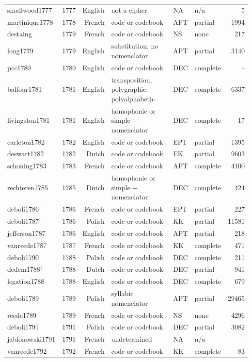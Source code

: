 {\begin{longtable}{@{}llrlllr@{}}
smallwood1777 & 1777 & English & not a cipher & NA & n/a & 5 \\
martinique1778 & 1778 & French & code or codebook & APT & partial & 1994 \\
destaing & 1779 & French & code or codebook & NS & none & 217 \\
long1779 & 1779 & English & substitution, no nomenclator & APT & partial & 3140 \\
pcc1780 & 1780 & English & code or codebook & DEC & complete & -- \\
balfour1781 & 1781 & English & transposition, polygraphic, polyalphabetic & DEC & complete & 6337 \\
livingston1781 & 1781 & English & homophonic or simple + nomenclator & DEC & complete & 17 \\
carleton1782 & 1782 & English & code or codebook & EPT & partial & 1395 \\
deswart1782 & 1782 & Dutch & code or codebook & EK & partial & 9603 \\
schoning1783 & 1783 & French & code or codebook & APT & complete & 4100 \\
rechteren1785 & 1785 & Dutch & homophonic or simple + nomenclator & DEC & complete & 424 \\
deboli1786$^\dagger$ & 1786 & French & code or codebook & EPT & partial & 227 \\
deboli1787$^\dagger$ & 1786 & Polish & code or codebook & KK & partial & 11581 \\
jefferson1787 & 1786 & English & code or codebook & APT & partial & 218 \\
vanreede1787 & 1787 & French & code or codebook & KK & complete & 471 \\
deboli1790 & 1788 & Polish & code or codebook & DEC & complete & 211 \\
dedem1788$^\dagger$ & 1788 & Dutch & code or codebook & DEC & partial & 941 \\
legation1788 & 1788 & English & code or codebook & DEC & complete & 679 \\
deboli1789 & 1789 & Polish & syllabic nomenclator & APT & partial & 29465 \\
reede1789 & 1789 & French & code or codebook & NS & none & 4296 \\
deboli1791 & 1791 & Polish & code or codebook & DEC & partial & 3082 \\
jablonowski1791 & 1791 & French & undetermined & NA & n/a & -- \\
vanreede1792 & 1792 & French & code or codebook & KK & complete & 83 \\

\end{longtable}}

